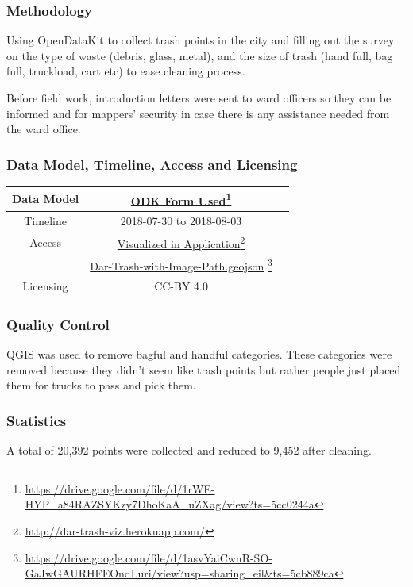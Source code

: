 \documentclass[a4paper,12pt,twoside]{article}
\begin{document}
\subsubsection{Methodology}
Using OpenDataKit to collect trash points in the city and filling out the survey on the type of waste (debris, glass, metal), and the size of trash (hand full, bag full, truckload, cart etc) to ease cleaning process.

Before field work, introduction letters were sent to ward officers so they can be informed and for mappers’ security in case there is any assistance needed from the ward office.

\subsubsection{Data Model, Timeline, Access and Licensing}
\begin{center}
\begin{tabular}{|c|c|c|}  

 \hline
Data Model &
\href{https://drive.google.com/file/d/1rWE-HYP_a84RAZSYKzy7DhoKaA_uZXag/view?ts=5cc0244a}{ODK Form Used}\footnote{\url{https://drive.google.com/file/d/1rWE-HYP_a84RAZSYKzy7DhoKaA_uZXag/view?ts=5cc0244a}} \\
 \hline
  Timeline  &  2018-07-30 to 2018-08-03 \\
\hline  
Access & {\href{http://dar-trash-viz.herokuapp.com/}{Visualized in Application}\footnote{\url{http://dar-trash-viz.herokuapp.com/}}}\\
{} & {\href{https://drive.google.com/file/d/1asvYaiCwnR-SO-GaJwGAURHFEOndLuri/view?usp=sharing_eil&ts=5cb889ca}{Dar-Trash-with-Image-Path.geojson} \footnote{\url{https://drive.google.com/file/d/1asvYaiCwnR-SO-GaJwGAURHFEOndLuri/view?usp=sharing_eil&ts=5cb889ca}}}\\
\hline
Licensing & CC-BY 4.0\\
\hline

\end{tabular}
\end{center}

\subsubsection{Quality Control}
QGIS was used to remove bagful and handful categories.
These categories were removed because they didn't seem like trash points but rather people just placed them for trucks to pass and pick them.


\subsubsection{Statistics}
A total of 20,392 points were collected and reduced to 9,452 after cleaning.
\end{document}
